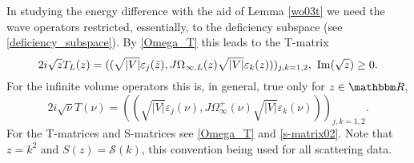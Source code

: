 In studying the energy difference with the aid of Lemma \ref{wo03t} we need the wave operators restricted, essentially,
to the deficiency subspace (see \eqref{deficiency_subspace}). 
By \ref{Omega_T} this leads to the T-matrix
\begin{equation}\label{Omega_matrix}
  2i\sqrt{z}T_L(z) = ( (\sqrt{|V|}\varepsilon_j(\bar z),J\Omega_{\infty,L}(z)\sqrt{|V|}\varepsilon_k(z)) )_{j,k=1,2},\
   \operatorname{Im}(\sqrt{z})\geq 0 .
\end{equation}
For the infinite volume operators this is, in general, true only for $z\in\R$,
\begin{equation*}
  2i\sqrt{\nu}T(\nu) = ( (\sqrt{|V|}\varepsilon_j(\nu),J\Omega_\infty^+(\nu)\sqrt{|V|}\varepsilon_k(\nu)) )_{j,k=1,2}.
\end{equation*}
For the T-matrices and S-matrices see \eqref{Omega_T} and \eqref{s-matrix02}. Note that $z=k^2$ and $S(z)=\mathscr{S}(k)$,
this convention being used for all scattering data.

